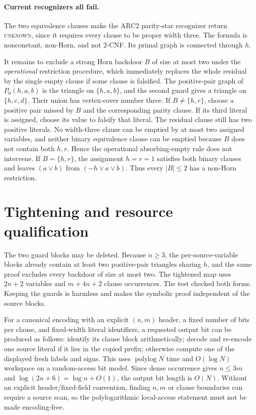 \documentclass[11pt]{article}
\newcommand{\Pzero}{P_0}
\begin{document}
\paragraph{Current recognizers all fail.}
The two equivalence clauses make the ARC2 parity-star recognizer return
\textsc{unknown}, since it requires every clause to be proper width three.
The formula is nonconstant, non-Horn, and not 2-CNF.  Its primal graph is
connected through $h$.

It remains to exclude a strong Horn backdoor $B$ of size at most two under the
\emph{operational} restriction procedure, which immediately replaces the
whole residual by the single empty clause if some clause is falsified.  The
positive-pair graph of $\Pzero(h,a,b)$ is the triangle on $\{h,a,b\}$, and the
second guard gives a triangle on $\{h,c,d\}$.  Their union has vertex-cover
number three.  If $B\neq\{h,r\}$, choose a positive pair missed by $B$ and the
corresponding parity clause.  If its third literal is assigned, choose its
value to falsify that literal.  The residual clause still has two positive
literals.  No width-three clause can be emptied by at most two assigned
variables, and neither binary equivalence clause can be emptied because
$B$ does not contain both $h,r$.  Hence the operational absorbing-empty rule
does not intervene.  If $B=\{h,r\}$, the assignment $h=r=1$ satisfies both
binary clauses and leaves $(a\vee b)$ from $(-h\vee a\vee b)$.  Thus every
$|B|\leq2$ has a non-Horn restriction.

\section{Tightening and resource qualification}
The two guard blocks may be deleted.  Because $n\geq3$, the per-source-variable
blocks already contain at least two positive-pair triangles sharing $h$, and
the same proof excludes every backdoor of size at most two.  The tightened
map uses $2n+2$ variables and $m+4n+2$ clause occurrences.  The test checked
both forms.  Keeping the guards is harmless and makes the symbolic proof
independent of the source blocks.

For a canonical encoding with an explicit $(n,m)$ header, a fixed number of
bits per clause, and fixed-width literal identifiers, a requested output bit
can be produced as follows: identify its clause block arithmetically; decode
and re-encode one source literal if it lies in the copied prefix; otherwise
compute one of the displayed fresh labels and signs.  This uses
$\operatorname{polylog}N$ time and $O(\log N)$ workspace on a random-access
bit model.  Since dense occurrence gives $n\leq3m$ and
$\log(2n+6)=\log n+O(1)$, the output bit length is $O(N)$.  Without an explicit
header/fixed-field convention, finding $n,m$ or clause boundaries can require
a source scan, so the polylogarithmic local-access statement must not be made
encoding-free.
\end{document}
